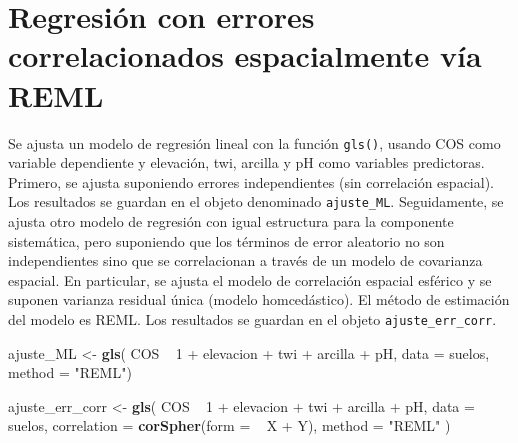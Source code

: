 \documentclass[11pt,b5paper,]{krantz}
\newenvironment{Shaded}{}{}
\newcommand{\DataTypeTok}[1]{\textcolor[rgb]{0.56,0.13,0.00}{#1}}
\newcommand{\DecValTok}[1]{\textcolor[rgb]{0.25,0.63,0.44}{#1}}
\newcommand{\KeywordTok}[1]{\textcolor[rgb]{0.00,0.44,0.13}{\textbf{#1}}}
\newcommand{\NormalTok}[1]{#1}
\newcommand{\OperatorTok}[1]{\textcolor[rgb]{0.40,0.40,0.40}{#1}}
\newcommand{\StringTok}[1]{\textcolor[rgb]{0.25,0.44,0.63}{#1}}
\begin{document}
\hypertarget{regresiuxf3n-con-errores-correlacionados-espacialmente-vuxeda-reml-1}{%
\section{Regresión con errores correlacionados espacialmente vía REML}\label{regresiuxf3n-con-errores-correlacionados-espacialmente-vuxeda-reml-1}}

Se ajusta un modelo de regresión lineal con la función \texttt{gls()}, usando COS como variable dependiente y elevación, twi, arcilla y pH como variables predictoras. Primero, se ajusta suponiendo errores independientes (sin correlación espacial). Los resultados se guardan en el objeto denominado \texttt{ajuste\_ML}. Seguidamente, se ajusta otro modelo de regresión con igual estructura para la componente sistemática, pero suponiendo que los términos de error aleatorio no son independientes sino que se correlacionan a través de un modelo de covarianza espacial. En particular, se ajusta el modelo de correlación espacial esférico y se suponen varianza residual única (modelo homcedástico). El método de estimación del modelo es REML. Los resultados se guardan en el objeto \texttt{ajuste\_err\_corr}.

\begin{Shaded}
\begin{Highlighting}[]
\NormalTok{ajuste_ML <-}\StringTok{ }\KeywordTok{gls}\NormalTok{(}
\NormalTok{  COS }\OperatorTok{~}\StringTok{ }\DecValTok{1} \OperatorTok{+}\StringTok{ }\NormalTok{elevacion }\OperatorTok{+}\StringTok{ }\NormalTok{twi }\OperatorTok{+}\StringTok{ }\NormalTok{arcilla }\OperatorTok{+}\StringTok{ }\NormalTok{pH,}
  \DataTypeTok{data =}\NormalTok{ suelos,}
  \DataTypeTok{method =} \StringTok{"REML"}\NormalTok{)}
\end{Highlighting}
\end{Shaded}

\begin{Shaded}
\begin{Highlighting}[]
\NormalTok{ajuste_err_corr <-}\StringTok{ }\KeywordTok{gls}\NormalTok{(}
\NormalTok{  COS }\OperatorTok{~}\StringTok{ }\DecValTok{1} \OperatorTok{+}\StringTok{ }\NormalTok{elevacion }\OperatorTok{+}\StringTok{ }\NormalTok{twi }\OperatorTok{+}\StringTok{ }\NormalTok{arcilla }\OperatorTok{+}\StringTok{ }\NormalTok{pH,}
  \DataTypeTok{data =}\NormalTok{ suelos,}
  \DataTypeTok{correlation =} \KeywordTok{corSpher}\NormalTok{(}\DataTypeTok{form =}  \OperatorTok{~}\StringTok{ }\NormalTok{X }\OperatorTok{+}\StringTok{ }\NormalTok{Y),}
  \DataTypeTok{method =} \StringTok{"REML"}
\NormalTok{)}
\end{Highlighting}
\end{Shaded}
\end{document}
